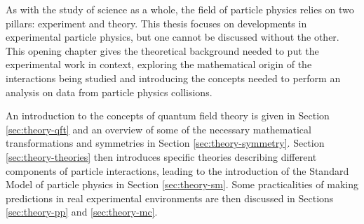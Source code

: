As with the study of science as a whole, the field of particle physics relies on
two pillars: experiment and theory. This thesis focuses on developments in
experimental particle physics, but one cannot be discussed without the other.
This opening chapter gives the theoretical background needed to put the
experimental work in context, exploring the mathematical origin of the
interactions being studied and introducing the concepts needed to perform an
analysis on data from particle physics collisions.

An introduction to the concepts of quantum field theory is given in Section
\ref{sec:theory-qft} and an overview of some of the necessary mathematical
transformations and symmetries in Section \ref{sec:theory-symmetry}. Section
\ref{sec:theory-theories} then introduces specific theories describing
different components of particle interactions, leading to the introduction of
the Standard Model of particle physics in Section \ref{sec:theory-sm}. Some
practicalities of making predictions in real experimental environments are then
discussed in Sections \ref{sec:theory-pp} and \ref{sec:theory-mc}.
